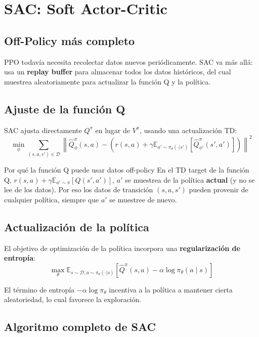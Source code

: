 \section{SAC: Soft Actor-Critic}

\subsection{Off-Policy más completo}

PPO todavía necesita recolectar datos nuevos periódicamente. SAC va más allá: usa un \textbf{replay buffer} para almacenar todos los datos históricos, del cual muestrea aleatoriamente para actualizar la función Q y la política.

\subsection{Ajuste de la función Q}

SAC ajusta directamente $Q^\pi$ en lugar de $V^\pi$, usando una actualización TD:
$$\min_\phi \sum_{(s,a,s') \in \mathcal{D}} \left\| \hat{Q}^\pi_\phi(s, a) - \left(r(s,a) + \gamma \mathbb{E}_{a' \sim \pi_\theta(\cdot|s')}\left[\hat{Q}^\pi_{\phi'}(s', a')\right]\right)\right\|^2$$

\begin{knowledgebox}{Por qué la función Q puede usar datos off-policy}
En el TD target de la función Q, $r(s,a) + \gamma \mathbb{E}_{a' \sim \pi}\left[Q(s', a')\right]$, $a'$ se muestrea de la política \textbf{actual} (y no se lee de los datos). Por eso los datos de transición $(s, a, s')$ pueden provenir de cualquier política, siempre que $a'$ se muestree de nuevo.
\end{knowledgebox}

\subsection{Actualización de la política}

El objetivo de optimización de la política incorpora una \textbf{regularización de entropía}:
$$\max_\theta \mathbb{E}_{s \sim \mathcal{D}, a \sim \pi_\theta(\cdot|s)} \left[\hat{Q}^\pi(s, a) - \alpha \log \pi_\theta(a \mid s)\right]$$

El término de entropía $-\alpha \log \pi_\theta$ incentiva a la política a mantener cierta aleatoriedad, lo cual favorece la exploración.

\subsection{Algoritmo completo de SAC}

